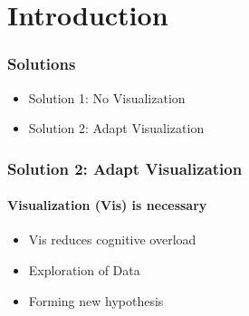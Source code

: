 \section{Introduction}

\begin{frame}
	\frametitle{Solutions}
	\begin{itemize}
		\item Solution 1: No Visualization
		\item Solution 2: Adapt Visualization
	\end{itemize}
\end{frame}

\begin{frame}
	\frametitle{Solution 2: Adapt Visualization}
	\framesubtitle{Visualization (Vis) is necessary}
	\begin{itemize}
		\item Vis reduces cognitive overload
		\item Exploration of Data 
		\item Forming new hypothesis 
	\end{itemize}
\end{frame}

